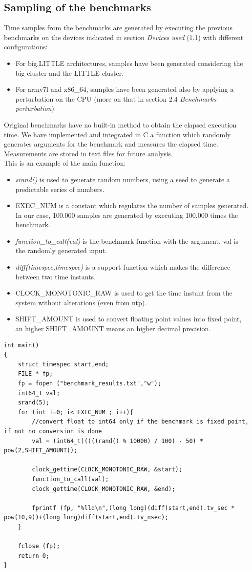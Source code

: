 \subsection{Sampling of the benchmarks}

Time samples from the benchmarks are generated by executing the previous benchmarks on the devices indicated in section \textit{Devices used} (1.1) with different configurations:
\begin{itemize}
	\item For big.LITTLE architectures, samples have been generated considering the big cluster and the LITTLE cluster.
	\item For armv7l and x86\_64, samples have been generated also by applying a perturbation on the CPU (more on that in section 2.4 \textit{Benchmarks perturbation})
\end{itemize}
Original benchmarks have no built-in method to obtain the elapsed execution time. We have implemented and integrated in C a function which randomly generates arguments for the benchmark and measures the elapsed time.\\
Measurements are stored in text files for future analysis.\\[0.3cm]
This is an example of the main function:
\begin{itemize}
	\item \textit{srand()} is used to generate random numbers, using a seed to generate a predictable series of numbers.
	\item EXEC\_NUM is a constant which regulates the number of samples generated. In our case, 100.000 samples are generated by executing 100.000 times the benchmark.
	\item \textit{function\_to\_call(val)} is the benchmark function with the argument, val is the randomly generated input.
	\item \textit{diff(timespec,timespec)} is a support function which makes the difference between two time instants.
	\item CLOCK\_MONOTONIC\_RAW is used to get the time instant from the system without alterations (even from ntp).
	\item SHIFT\_AMOUNT is used to convert floating point values into fixed point, an higher SHIFT\_AMOUNT means an higher decimal precision.
\end{itemize}
\begin{lstlisting}
int main()
{
	struct timespec start,end;
	FILE * fp;
	fp = fopen ("benchmark_results.txt","w");
	int64_t val;
	srand(5);
	for (int i=0; i< EXEC_NUM ; i++){
		//convert float to int64 only if the benchmark is fixed point, if not no conversion is done
		val = (int64_t)((((rand() % 10000) / 100) - 50) * pow(2,SHIFT_AMOUNT));
		
		clock_gettime(CLOCK_MONOTONIC_RAW, &start);
		function_to_call(val);
		clock_gettime(CLOCK_MONOTONIC_RAW, &end);
		
		fprintf (fp, "%lld\n",(long long)(diff(start,end).tv_sec * pow(10,9))+(long long)diff(start,end).tv_nsec);
	}
	
	fclose (fp);
	return 0;
}
\end{lstlisting}

